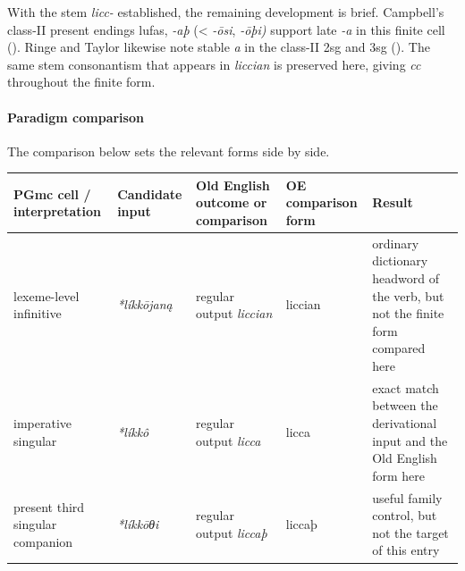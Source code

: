 \documentclass[
  british,
  a4paper,
]{article}
\newcounter{none} %
\begin{document}
With the stem \emph{licc-} established, the remaining development is
brief. Campbell's class-II present endings lufas, \emph{-aþ}
(\textless{} \emph{-ōsi}, \emph{-ōþi)} support late \emph{-a} in this
finite cell ().
Ringe and Taylor likewise note stable \emph{a} in the class-II 2sg and
3sg (). The
same stem consonantism that appears in \emph{liccian} is preserved here,
giving \emph{cc} throughout the finite form.

\paragraph{Paradigm comparison}\label{paradigm-comparison-24}

The comparison below sets the relevant forms side by side.

{\def\LTcaptype{none} %
\begin{longtable}[]{@{}
  >{\raggedright\arraybackslash}p{}
  >{\raggedright\arraybackslash}p{}
  >{\raggedright\arraybackslash}p{}
  >{\raggedright\arraybackslash}p{}
  >{\raggedright\arraybackslash}p{}@{}}
\toprule\noalign{}
\begin{minipage}[b]{\linewidth}\raggedright
PGmc cell / interpretation
\end{minipage} & \begin{minipage}[b]{\linewidth}\raggedright
Candidate input
\end{minipage} & \begin{minipage}[b]{\linewidth}\raggedright
Old English outcome or comparison
\end{minipage} & \begin{minipage}[b]{\linewidth}\raggedright
OE comparison form
\end{minipage} & \begin{minipage}[b]{\linewidth}\raggedright
Result
\end{minipage} \\
\midrule\noalign{}
\endhead
\bottomrule\noalign{}
\endlastfoot
lexeme-level infinitive & \emph{*líkkōjaną} & regular output
\emph{liccian} & liccian & ordinary dictionary headword of the verb, but
not the finite form compared here \\
imperative singular & \emph{*líkkô} & regular output \emph{licca} &
licca & exact match between the derivational input and the Old English
form here \\
present third singular companion & \emph{*líkkōθi} & regular output
\emph{liccaþ} & liccaþ & useful family control, but not the target of
this entry \\
\end{longtable}
}
\end{document}

